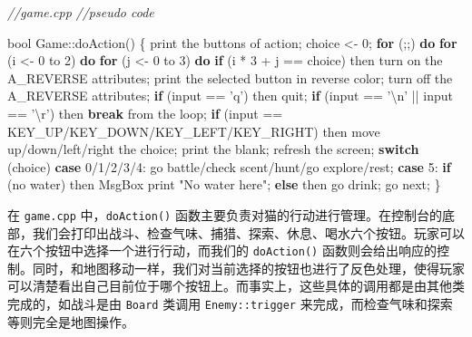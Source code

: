 \documentclass[hyperref,UTF8,a4paper]{ctexart}
\newenvironment{Shaded}{}{}
\newcommand{\CharTok}[1]{\textcolor[rgb]{0.25,0.44,0.63}{#1}}
\newcommand{\CommentTok}[1]{\textcolor[rgb]{0.38,0.63,0.69}{\textit{#1}}}
\newcommand{\ControlFlowTok}[1]{\textcolor[rgb]{0.00,0.44,0.13}{\textbf{#1}}}
\newcommand{\DataTypeTok}[1]{\textcolor[rgb]{0.56,0.13,0.00}{#1}}
\newcommand{\DecValTok}[1]{\textcolor[rgb]{0.25,0.63,0.44}{#1}}
\newcommand{\NormalTok}[1]{#1}
\newcommand{\SpecialCharTok}[1]{\textcolor[rgb]{0.25,0.44,0.63}{#1}}
\newcommand{\StringTok}[1]{\textcolor[rgb]{0.25,0.44,0.63}{#1}}
\begin{document}
\begin{Shaded}
\begin{Highlighting}[]
\CommentTok{//game.cpp}
\CommentTok{//pseudo code}

\DataTypeTok{bool}\NormalTok{ Game::doAction()}
\NormalTok{\{}
\NormalTok{    print the buttons of action;}
\NormalTok{    choice <- }\DecValTok{0}\NormalTok{;}
    \ControlFlowTok{for}\NormalTok{ (;;) }\ControlFlowTok{do}
        \ControlFlowTok{for}\NormalTok{ (i <- }\DecValTok{0}\NormalTok{ to }\DecValTok{2}\NormalTok{) }\ControlFlowTok{do}
            \ControlFlowTok{for}\NormalTok{ (j <- }\DecValTok{0}\NormalTok{ to }\DecValTok{3}\NormalTok{) }\ControlFlowTok{do}
                \ControlFlowTok{if}\NormalTok{ (i * }\DecValTok{3}\NormalTok{ + j == choice) then}
\NormalTok{                    turn on the A_REVERSE attributes;}
\NormalTok{                print the selected button in reverse color;}
\NormalTok{                turn off the A_REVERSE attributes;}
        \ControlFlowTok{if}\NormalTok{ (input == }\CharTok{'q'}\NormalTok{) then}
\NormalTok{            quit;}
        \ControlFlowTok{if}\NormalTok{ (input == }\CharTok{'}\SpecialCharTok{\textbackslash{}n}\CharTok{'}\NormalTok{ || input == }\CharTok{'}\SpecialCharTok{\textbackslash{}r}\CharTok{'}\NormalTok{) then}
            \ControlFlowTok{break}\NormalTok{ from the loop;}
        \ControlFlowTok{if}\NormalTok{ (input == KEY_UP/KEY_DOWN/KEY_LEFT/KEY_RIGHT) then}
\NormalTok{            move up/down/left/right the choice;}
\NormalTok{        print the blank;}
\NormalTok{        refresh the screen;}
    \ControlFlowTok{switch}\NormalTok{ (choice)}
        \ControlFlowTok{case} \DecValTok{0}\NormalTok{/}\DecValTok{1}\NormalTok{/}\DecValTok{2}\NormalTok{/}\DecValTok{3}\NormalTok{/}\DecValTok{4}\NormalTok{: go battle/check scent/hunt/go explore/rest;}
        \ControlFlowTok{case} \DecValTok{5}\NormalTok{:}
        \ControlFlowTok{if}\NormalTok{ (no water) then}
\NormalTok{            MsgBox print }\StringTok{"No water here"}\NormalTok{;}
        \ControlFlowTok{else}\NormalTok{ then}
\NormalTok{            go drink;}
\NormalTok{    go next;}
\NormalTok{\}}
\end{Highlighting}
\end{Shaded}

在 \texttt{game.cpp} 中，\texttt{doAction()}
函数主要负责对猫的行动进行管理。在控制台的底部，我们会打印出战斗、检查气味、捕猎、探索、休息、喝水六个按钮。玩家可以在六个按钮中选择一个进行行动，而我们的
\texttt{doAction()}
函数则会给出响应的控制。同时，和地图移动一样，我们对当前选择的按钮也进行了反色处理，使得玩家可以清楚看出自己目前位于哪个按钮上。而事实上，这些具体的调用都是由其他类完成的，如战斗是由
\texttt{Board} 类调用 \texttt{Enemy::trigger}
来完成，而检查气味和探索等则完全是地图操作。
\end{document}
